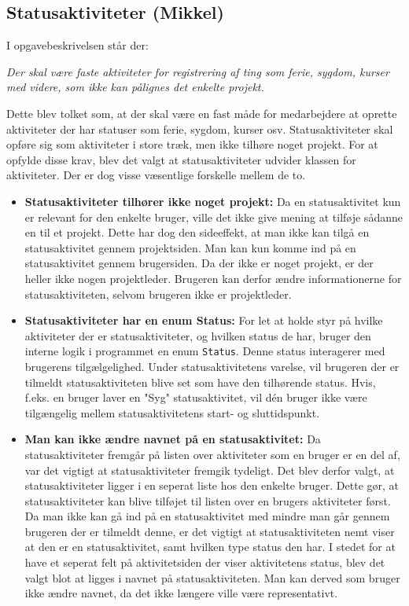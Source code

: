 \subsection{Statusaktiviteter (Mikkel)}




I opgavebeskrivelsen står der:

\textit{Der skal være faste aktiviteter for registrering af ting som ferie, sygdom, kurser med videre, som ikke kan pålignes det enkelte projekt.}

Dette blev tolket som, at der skal være en fast måde for medarbejdere at oprette aktiviteter der har statuser som ferie, sygdom, kurser osv. Statusaktiviteter skal opføre sig som aktiviteter i store træk, men ikke tilhøre noget projekt. For at opfylde disse krav, blev det valgt at statusaktiviteter udvider klassen for aktiviteter. Der er dog visse væsentlige forskelle mellem de to.

\begin{itemize}
    \item \textbf{Statusaktiviteter tilhører ikke noget projekt:} Da en statusaktivitet kun er relevant for den enkelte bruger, ville det ikke give mening at tilføje sådanne en til et projekt. Dette har dog den sideeffekt, at man ikke kan tilgå en statusaktivitet gennem projektsiden. Man kan kun komme ind på en statusaktivitet gennem brugersiden. Da der ikke er noget projekt, er der heller ikke nogen projektleder. Brugeren kan derfor ændre informationerne for statusaktiviteten, selvom brugeren ikke er projektleder.
    \item \textbf{Statusaktiviteter har en enum Status:} For let at holde styr på hvilke aktiviteter der er statusaktiviteter, og hvilken status de har, bruger den interne logik i programmet en enum \texttt{Status}. Denne status interagerer med brugerens tilgælgelighed. Under statusaktivitetens varelse, vil brugeren der er tilmeldt statusaktiviteten blive set som have den tilhørende status. Hvis, f.eks. en bruger laver en "Syg" statusaktivitet, vil dén bruger ikke være tilgængelig mellem statusaktivitetens start- og sluttidspunkt.
    \item \textbf{Man kan ikke ændre navnet på en statusaktivitet:} Da statusaktiviteter fremgår på listen over aktiviteter som en bruger er en del af, var det vigtigt at statusaktiviteter fremgik tydeligt. Det blev derfor valgt, at statusaktiviteter ligger i en seperat liste hos den enkelte bruger. Dette gør, at statusaktiviteter kan blive tilføjet til listen over en brugers aktiviteter først. Da man ikke kan gå ind på en statusaktivitet med mindre man går gennem brugeren der er tilmeldt denne, er det vigtigt at statusaktiviteten nemt viser at den er en statusaktivitet, samt hvilken type status den har. I stedet for at have et seperat felt på aktivitetsiden der viser aktivitetens status, blev det valgt blot at ligges i navnet på statusaktiviteten. Man kan derved som bruger ikke ændre navnet, da det ikke længere ville være representativt.
\end{itemize}






